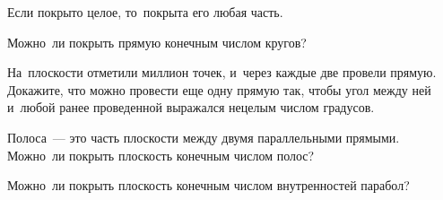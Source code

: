 Если покрыто целое, то~покрыта его любая часть.

\begin{problems}

\item
Можно~ли покрыть прямую конечным числом кругов?

\item
На~плоскости отметили миллион точек, и~через каждые две провели прямую.
Докажите, что можно провести еще одну прямую так, чтобы угол между ней
и~любой ранее проведенной выражался нецелым числом градусов.

\item
Полоса~--- это часть плоскости между двумя параллельными прямыми.
Можно~ли покрыть плоскость конечным числом полос?

\item
Можно~ли покрыть плоскость конечным числом внутренностей парабол?

\end{problems}

